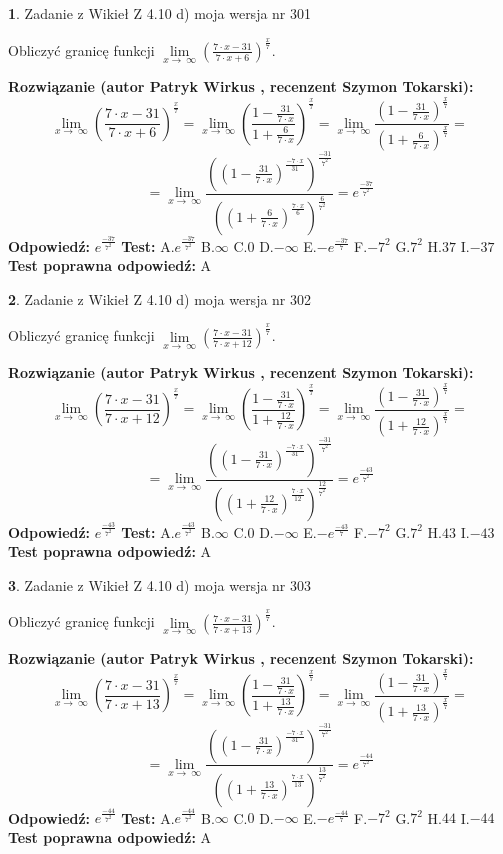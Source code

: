 \documentclass[12pt, a4paper]{article}
\theoremstyle{definition} %
\newtheorem{zad}{}
\newcommand{\zadStart}[1]{\begin{zad}#1\newline}
\newcommand{\zadStop}{\end{zad}}
\newcommand{\rozwStart}[2]{\noindent \textbf{Rozwiązanie (autor #1 , recenzent #2): }\newline}
\newcommand{\rozwStop}{\newline}
\newcommand{\odpStart}{\noindent \textbf{Odpowiedź:}\newline}
\newcommand{\odpStop}{\newline}
\newcommand{\testStart}{\noindent \textbf{Test:}\newline}
\newcommand{\testStop}{\newline}
\newcommand{\kluczStart}{\noindent \textbf{Test poprawna odpowiedź:}\newline}
\newcommand{\kluczStop}{\newline}
\begin{document}
\zadStart{Zadanie z Wikieł Z 4.10 d) moja wersja nr 301}


Obliczyć granicę funkcji  $\lim\limits_{x\to\ \infty}(\frac{7\cdot x-31}{7\cdot x+6})^{\frac{x}{7}}$.
\zadStop
\rozwStart{Patryk Wirkus}{Szymon Tokarski}
$$\lim\limits_{x\to\ \infty}(\frac{7\cdot x-31}{7\cdot x+6})^{\frac{x}{7}} = \lim\limits_{x\to\ \infty}(\frac{1-\frac{31}{7\cdot x}}{1+\frac{6}{7\cdot x}})^{\frac{x}{7}}=\lim\limits_{x\to\ \infty}\frac{(1-\frac{31}{7\cdot x})^{\frac{x}{7}}}{(1+\frac{6}{7\cdot x})^{\frac{x}{7}}}=$$
$$=\lim\limits_{x\to\ \infty}\frac{((1-\frac{31}{7\cdot x})^{\frac{-7\cdot x}{31}})^{\frac{-31}{7^{2}}}}{((1+\frac{6}{7\cdot x})^{\frac{7\cdot x}{6}})^{\frac{6}{7^{2}}}}=e^{\frac{-37}{7^{2}}}$$
\rozwStop
\odpStart
$e^{\frac{-37}{7^{2}}}$
\odpStop
\testStart
A.$e^{\frac{-37}{7^{2}}}$ B.$\infty$ C.$0$ D.$-\infty$ E.$-e^{\frac{-37}{7}}$
F.$-7^{2}$ G.$7^{2}$
H.$37$
I.$-37$
\testStop
\kluczStart
A
\kluczStop



\zadStart{Zadanie z Wikieł Z 4.10 d) moja wersja nr 302}


Obliczyć granicę funkcji  $\lim\limits_{x\to\ \infty}(\frac{7\cdot x-31}{7\cdot x+12})^{\frac{x}{7}}$.
\zadStop
\rozwStart{Patryk Wirkus}{Szymon Tokarski}
$$\lim\limits_{x\to\ \infty}(\frac{7\cdot x-31}{7\cdot x+12})^{\frac{x}{7}} = \lim\limits_{x\to\ \infty}(\frac{1-\frac{31}{7\cdot x}}{1+\frac{12}{7\cdot x}})^{\frac{x}{7}}=\lim\limits_{x\to\ \infty}\frac{(1-\frac{31}{7\cdot x})^{\frac{x}{7}}}{(1+\frac{12}{7\cdot x})^{\frac{x}{7}}}=$$
$$=\lim\limits_{x\to\ \infty}\frac{((1-\frac{31}{7\cdot x})^{\frac{-7\cdot x}{31}})^{\frac{-31}{7^{2}}}}{((1+\frac{12}{7\cdot x})^{\frac{7\cdot x}{12}})^{\frac{12}{7^{2}}}}=e^{\frac{-43}{7^{2}}}$$
\rozwStop
\odpStart
$e^{\frac{-43}{7^{2}}}$
\odpStop
\testStart
A.$e^{\frac{-43}{7^{2}}}$ B.$\infty$ C.$0$ D.$-\infty$ E.$-e^{\frac{-43}{7}}$
F.$-7^{2}$ G.$7^{2}$
H.$43$
I.$-43$
\testStop
\kluczStart
A
\kluczStop



\zadStart{Zadanie z Wikieł Z 4.10 d) moja wersja nr 303}


Obliczyć granicę funkcji  $\lim\limits_{x\to\ \infty}(\frac{7\cdot x-31}{7\cdot x+13})^{\frac{x}{7}}$.
\zadStop
\rozwStart{Patryk Wirkus}{Szymon Tokarski}
$$\lim\limits_{x\to\ \infty}(\frac{7\cdot x-31}{7\cdot x+13})^{\frac{x}{7}} = \lim\limits_{x\to\ \infty}(\frac{1-\frac{31}{7\cdot x}}{1+\frac{13}{7\cdot x}})^{\frac{x}{7}}=\lim\limits_{x\to\ \infty}\frac{(1-\frac{31}{7\cdot x})^{\frac{x}{7}}}{(1+\frac{13}{7\cdot x})^{\frac{x}{7}}}=$$
$$=\lim\limits_{x\to\ \infty}\frac{((1-\frac{31}{7\cdot x})^{\frac{-7\cdot x}{31}})^{\frac{-31}{7^{2}}}}{((1+\frac{13}{7\cdot x})^{\frac{7\cdot x}{13}})^{\frac{13}{7^{2}}}}=e^{\frac{-44}{7^{2}}}$$
\rozwStop
\odpStart
$e^{\frac{-44}{7^{2}}}$
\odpStop
\testStart
A.$e^{\frac{-44}{7^{2}}}$ B.$\infty$ C.$0$ D.$-\infty$ E.$-e^{\frac{-44}{7}}$
F.$-7^{2}$ G.$7^{2}$
H.$44$
I.$-44$
\testStop
\kluczStart
A
\kluczStop
\end{document}
